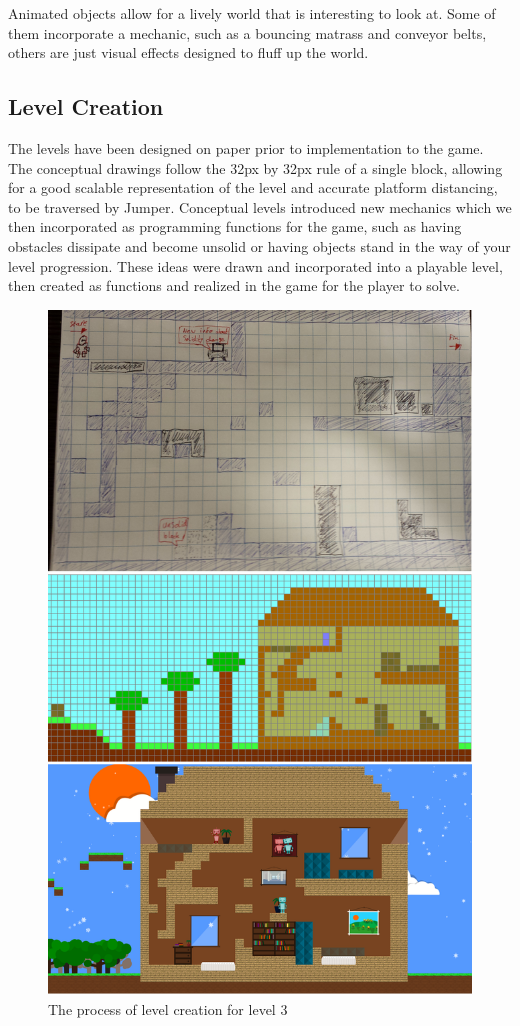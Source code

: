 \documentclass[a4paper,twoside,12pt]{article}
\begin{document}
Animated objects allow for a lively world that is interesting to look at. Some of them incorporate a mechanic, such as a bouncing matrass and conveyor belts, others are just visual effects designed to fluff up the world. 


\subsection{Level Creation}
The levels have been designed on paper prior to implementation to the game. The conceptual drawings follow the 32px by 32px rule of a single block, allowing for a good scalable representation of the level and accurate platform distancing, to be traversed by Jumper. Conceptual levels introduced new mechanics which we then incorporated as programming functions for the game, such as having obstacles dissipate and become unsolid or having objects stand in the way of your level progression. These ideas were drawn and incorporated into a playable level, then created as functions and realized in the game for the player to solve.

\begin{figure}[H]
\includegraphics[scale=0.3]{levelSketchAndDesign.png}
\caption{The process of level creation for level 3}
\end{figure}
\end{document}

